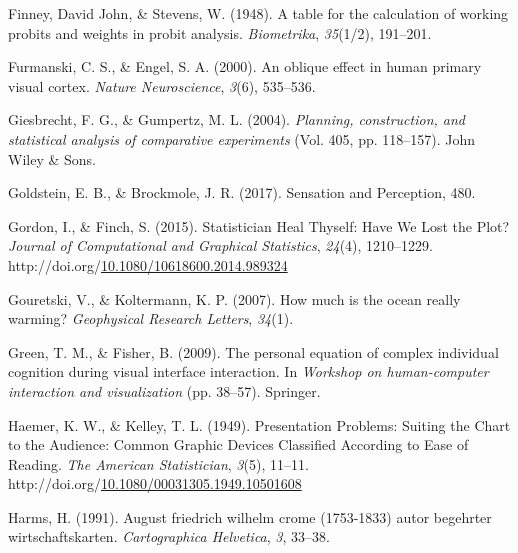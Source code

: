 \documentclass[print]{nuthesis}
\newlength{\cslhangindent}
\newenvironment{CSLReferences}%
{\setlength{\parindent}{0pt}%
\everypar{\setlength{\hangindent}{\cslhangindent}}\ignorespaces}%
{\par}
\begin{document}
\begin{CSLReferences}{1}{0}
\leavevmode{}%
Finney, David John, \& Stevens, W. (1948). A table for the calculation of working probits and weights in probit analysis. \emph{Biometrika}, \emph{35}(1/2), 191--201.

\leavevmode{}%
Furmanski, C. S., \& Engel, S. A. (2000). An oblique effect in human primary visual cortex. \emph{Nature Neuroscience}, \emph{3}(6), 535--536.

\leavevmode{}%
Giesbrecht, F. G., \& Gumpertz, M. L. (2004). \emph{Planning, construction, and statistical analysis of comparative experiments} (Vol. 405, pp. 118--157). John Wiley \& Sons.

\leavevmode{}%
Goldstein, E. B., \& Brockmole, J. R. (2017). Sensation and {Perception}, 480.

\leavevmode{}%
Gordon, I., \& Finch, S. (2015). Statistician {Heal} {Thyself}: {Have} {We} {Lost} the {Plot}? \emph{Journal of Computational and Graphical Statistics}, \emph{24}(4), 1210--1229. http://doi.org/\href{https://doi.org/10.1080/10618600.2014.989324}{10.1080/10618600.2014.989324}

\leavevmode{}%
Gouretski, V., \& Koltermann, K. P. (2007). How much is the ocean really warming? \emph{Geophysical Research Letters}, \emph{34}(1).

\leavevmode{}%
Green, T. M., \& Fisher, B. (2009). The personal equation of complex individual cognition during visual interface interaction. In \emph{Workshop on human-computer interaction and visualization} (pp. 38--57). Springer.

\leavevmode{}%
Haemer, K. W., \& Kelley, T. L. (1949). Presentation {Problems}: {Suiting} the {Chart} to the {Audience}: {Common} {Graphic} {Devices} {Classified} {According} to {Ease} of {Reading}. \emph{The American Statistician}, \emph{3}(5), 11--11. http://doi.org/\href{https://doi.org/10.1080/00031305.1949.10501608}{10.1080/00031305.1949.10501608}

\leavevmode{}%
Harms, H. (1991). August friedrich wilhelm crome (1753-1833) autor begehrter wirtschaftskarten. \emph{Cartographica Helvetica}, \emph{3}, 33--38.


\end{CSLReferences}
\end{document}
